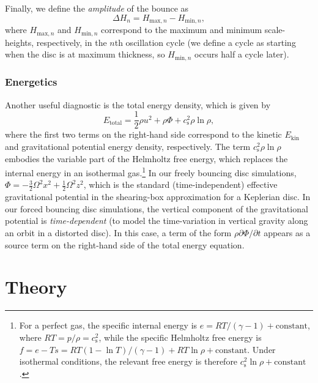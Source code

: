 \documentclass[fleqn,usenatbib]{mnras}
\begin{document}
Finally, we define the \textit{amplitude} of the bounce as
\begin{equation}
\Delta H_n=H_{\text{max},n}-H_{\text{min},n},
\label{EQUN_OscillationAmplitude}
\end{equation}
where $H_{\text{max},n}$ and $H_{\text{min},n}$ correspond to the maximum and minimum scale-heights, respectively, in the $n$th oscillation cycle (we define a cycle as starting when the disc is at maximum thickness, so $H_{\text{min},n}$ occurs half a cycle later).

\subsubsection{Energetics}
Another useful diagnostic is the total energy density, which is given by
\begin{equation}
E_\text{total} = \frac{1}{2}\rho u^2 + \rho \Phi + c_\text{s}^2 \rho \ln{\rho},
\label{EQUN_TotalEnergy}
\end{equation}
where the first two terms on the right-hand side correspond to the kinetic $E_{\text{kin}}$ and gravitational potential energy density, respectively.  %
The term $c_\text{s}^2 \rho \ln{\rho}$ embodies the variable part of the Helmholtz free energy, which replaces the internal energy in an isothermal gas.\footnote{For a perfect gas, the specific internal energy is $e=RT/(\gamma-1)+\text{constant}$, where $RT=p/\rho=c_\text{s}^2$, while the specific Helmholtz free energy is $f=e-Ts=RT(1-\ln T)/(\gamma-1)+RT\ln \rho+\text{constant}$. Under isothermal conditions, the relevant free energy is therefore $c_\text{s}^2\ln\rho+\text{constant}$.} In our freely bouncing disc simulations, $\Phi =-\frac{3}{2}\Omega^2x^2+\frac{1}{2}\Omega^2z^2$, which is the standard (time-independent) effective gravitational potential in the shearing-box approximation for a Keplerian disc. In our forced bouncing disc simulations, the vertical component of the gravitational potential is \textit{time-dependent} (to model the time-variation in vertical gravity along an orbit in a distorted disc). In this case, a term of the form $\rho \partial\Phi/\partial t$ appears as a source term on the right-hand side of the total energy equation.



\section{Theory}
\label{RESULTS_Theory}
\end{document}
